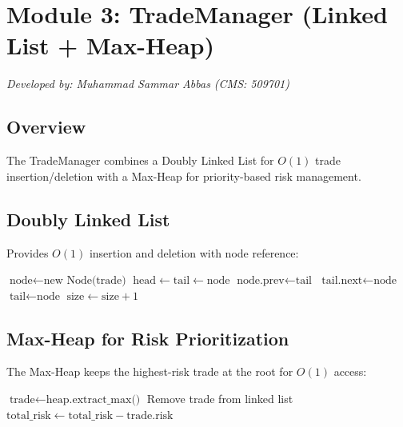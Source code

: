 \documentclass[12pt, a4paper]{article}
\begin{document}
\section{Module 3: TradeManager (Linked List + Max-Heap)}
\textit{Developed by: Muhammad Sammar Abbas (CMS: 509701)}

\subsection{Overview}
The TradeManager combines a Doubly Linked List for $O(1)$ trade insertion/deletion with a Max-Heap for priority-based risk management.

\subsection{Doubly Linked List}
Provides $O(1)$ insertion and deletion with node reference:

\begin{algorithm}[H]
\caption{LinkedList Insert at Tail}
\begin{algorithmic}[1]
    \State $\text{node} \gets \text{new Node(trade)}$
        \State $\text{head} \gets \text{tail} \gets \text{node}$
    \Else
        \State $\text{node.prev} \gets \text{tail}$
        \State $\text{tail.next} \gets \text{node}$
        \State $\text{tail} \gets \text{node}$
    \EndIf
    \State $\text{size} \gets \text{size} + 1$
\EndProcedure
\end{algorithmic}
\end{algorithm}

\subsection{Max-Heap for Risk Prioritization}
The Max-Heap keeps the highest-risk trade at the root for $O(1)$ access:

\begin{algorithm}[H]
\caption{Greedy Risk Enforcement}
\begin{algorithmic}[1]
        \State $\text{trade} \gets \text{heap.extract\_max()}$ 
        \State Remove trade from linked list 
        \State $\text{total\_risk} \gets \text{total\_risk} - \text{trade.risk}$
    \EndWhile
\EndProcedure
\end{algorithmic}
\end{algorithm}
\end{document}
